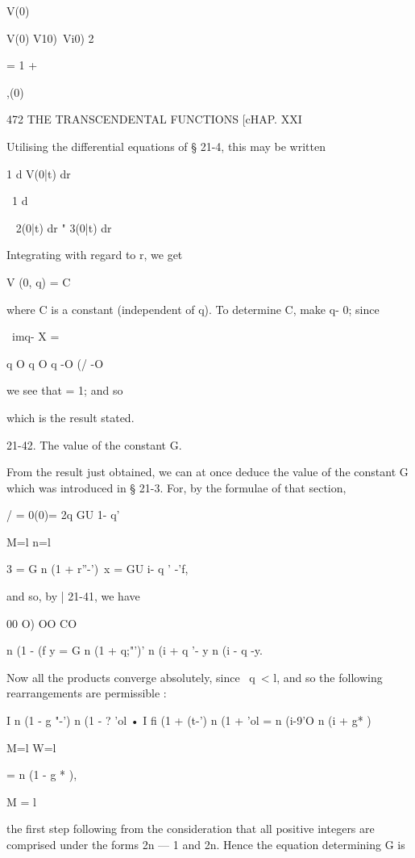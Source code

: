 V(0) 



 V(0) V10)\  Vi0) 2  



= 1 + 



 ,(0) %



472 THE TRANSCENDENTAL FUNCTIONS [cHAP. XXI 

Utilising the differential equations of § 21-4, this may be written 

1 d%
V(0|t) dr 

\  1 d%

~ 2(0|t) dr " 3(0|t) dr %

Integrating with regard to r, we get 

V (0, q) = C%

where C is a constant (independent of q). To determine C, make q- 0; since 

\ imq- X = %

q O q O q -O (/ -O 

we see that = 1; and so 

which is the result stated. 

21-42. The value of the constant G. 

From the result just obtained, we can at once deduce the value of the 
constant G which was introduced in § 21-3. 
For, by the formulae of that section, 

 / = 0(0)= 2q  GU 1- q' %

M=l n=l 

 3 = G  n (1 + r''-')\ x = GU i- q ' -'f, 

and so, by | 21-41, we have 

00 O) OO CO 

n (1 - (f y = G  n (1 + q;"')' n (i + q '- y n (i - q  -y. 

Now all the products converge absolutely, since \ q\ < l, and so the 
following rearrangements are permissible : 

I n (1 - g "-') n (1 - ? 'ol • I fi (1 + (t-') n (1 +  'ol 
= n (i-9'O n (i + g* ) 

M=l W=l 

= n (1 - g * ), 

M = l 

the first step following from the consideration that all positive integers are 
comprised under the forms 2n — 1 and 2n. 
Hence the equation determining G is 


